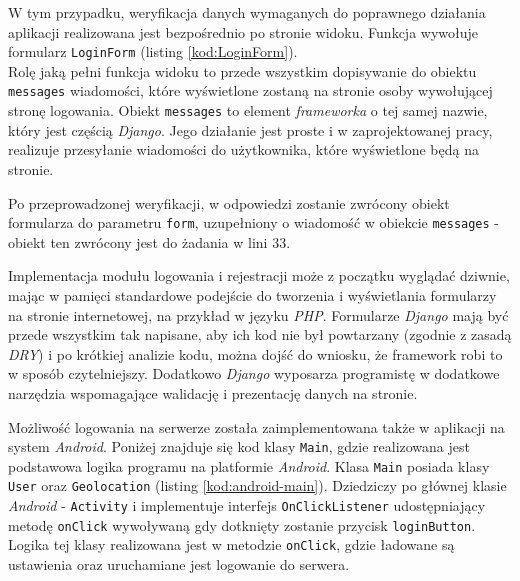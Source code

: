 

\vspace{1em}
W tym przypadku, weryfikacja danych wymaganych do poprawnego działania aplikacji realizowana jest bezpośrednio po stronie widoku. Funkcja wywołuje formularz \texttt{LoginForm} (listing \ref{kod:LoginForm}).\\



\vspace{1em}
Rolę jaką pełni funkcja widoku to przede wszystkim dopisywanie do obiektu \texttt{messages} wiadomości, które wyświetlone zostaną na stronie osoby wywołującej stronę logowania. Obiekt \texttt{messages} to element \emph{frameworka} o tej samej nazwie, który jest częścią \emph{Django}. Jego działanie jest proste i w zaprojektowanej pracy, realizuje przesyłanie wiadomości do użytkownika, które wyświetlone będą na stronie.

Po przeprowadzonej weryfikacji, w odpowiedzi zostanie zwrócony obiekt formularza do parametru \texttt{form}, uzupełniony o wiadomość w obiekcie \texttt{messages} - obiekt ten zwrócony jest do żadania w lini 33. 

Implementacja modułu logowania i rejestracji może z początku wyglądać dziwnie, mając w pamięci standardowe podejście do tworzenia i wyświetlania formularzy na stronie internetowej, na przykład w języku \emph{PHP}. Formularze \emph{Django} mają być przede wszystkim tak napisane, aby ich kod nie był powtarzany (zgodnie z zasadą \emph{DRY}) i po krótkiej analizie kodu, można dojść do wniosku, że framework robi to w sposób czytelniejszy. Dodatkowo \emph{Django} wyposarza programistę w dodatkowe narzędzia wspomagające walidację i prezentację danych na stronie.

Możliwość logowania na serwerze została zaimplementowana także w aplikacji na system \emph{Android}. Poniżej znajduje się kod klasy \texttt{Main}, gdzie realizowana jest podstawowa logika programu na platformie \emph{Android}.
Klasa \texttt{Main} posiada klasy \texttt{User} oraz \texttt{Geolocation} (listing \ref{kod:android-main}). Dziedziczy po głównej klasie \emph{Android} - \texttt{Activity} i implementuje interfejs \texttt{OnClickListener} udostępniający metodę \texttt{onClick} wywoływaną gdy dotknięty zostanie przycisk \texttt{loginButton}. Logika tej klasy realizowana jest w metodzie \texttt{onClick}, gdzie ładowane są ustawienia oraz uruchamiane jest logowanie do serwera.\\

